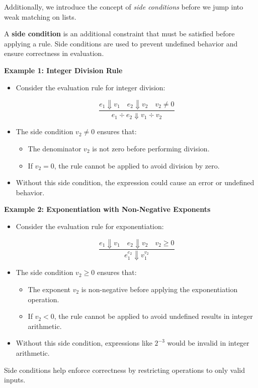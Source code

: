 \noindent
Additionally, we introduce the concept of \textit{side conditions} before we jump into weak matching on lists.

\begin{Def}

    A \textbf{side condition} is an additional constraint that must be satisfied before applying a rule. Side conditions are used to prevent undefined behavior and ensure correctness in evaluation.

    \textbf{Example 1: Integer Division Rule}

    \begin{itemize}
        \item Consider the evaluation rule for integer division:

        \LARGE
        \[
        \dfrac{e_1 \Downarrow v_1 \quad e_2 \Downarrow v_2 \quad v_2 \neq 0}
        {e_1 \div e_2 \Downarrow v_1 \div v_2}
        \]
        \normalsize

        \item The side condition \LARGE $v_2 \neq 0$ \normalsize ensures that:
        \begin{itemize}
            \item The denominator $v_2$ is not zero before performing division.
            \item If $v_2 = 0$, the rule cannot be applied to avoid division by zero.
        \end{itemize}

        \item Without this side condition, the expression could cause an error or undefined behavior.
    \end{itemize}

    \textbf{Example 2: Exponentiation with Non-Negative Exponents}

    \begin{itemize}
        \item Consider the evaluation rule for exponentiation:

        \LARGE
        \[
        \dfrac{e_1 \Downarrow v_1 \quad e_2 \Downarrow v_2 \quad v_2 \geq 0}
        {e_1^{e_2} \Downarrow v_1^{v_2}}
        \]
        \normalsize

        \item The side condition \LARGE $v_2 \geq 0$ \normalsize ensures that:
        \begin{itemize}
            \item The exponent $v_2$ is non-negative before applying the exponentiation operation.
            \item If $v_2 < 0$, the rule cannot be applied to avoid undefined results in integer arithmetic.
        \end{itemize}

        \item Without this side condition, expressions like $2^{-3}$ would be invalid in integer arithmetic.
    \end{itemize}

    Side conditions help enforce correctness by restricting operations to only valid inputs.

\end{Def}
